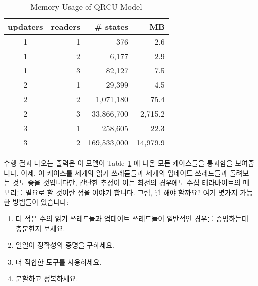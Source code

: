\begin{table}
\footnotesize
\centering
\begin{tabular}{c|r|r|r}
	updaters &
	    readers &
		   \# states & MB \\
	\hline
	1 & 1 &         376 &      2.6 \\
	\hline
	1 & 2 &       6,177 &      2.9 \\
	\hline
	1 & 3 &      82,127 &      7.5 \\
	\hline
	2 & 1 &      29,399 &      4.5 \\
	\hline
	2 & 2 &   1,071,180 &     75.4 \\
	\hline
	2 & 3 &  33,866,700 &  2,715.2 \\
	\hline
	3 & 1 &     258,605 &     22.3 \\
	\hline
	3 & 2 & 169,533,000 & 14,979.9 \\
\end{tabular}
\caption{Memory Usage of QRCU Model}
\label{tab:advsync:Memory Usage of QRCU Model}
\end{table}

수행 결과 나오는 출력은 이 모델이
Table~\ref{tab:advsync:Memory Usage of QRCU Model} 에 나온 모든 케이스들을
통과함을 보여줍니다.
이제, 이 케이스를 세개의 읽기 쓰레듣들과 세개의 업데이트 쓰레드들과 돌려보는
것도 좋을 것입니다만, 간단한 추정이 이는 최선의 경우에도 수십 테라바이트의
메모리를 필요로 할 것이란 점을 이야기 합니다.
그럼, 뭘 해야 할까요?
여기 몇가지 가능한 방법들이 있습니다:
\iffalse

The resulting output shows that this model passes all of the cases
shown in
Table~\ref{tab:advsync:Memory Usage of QRCU Model}.
Now, it would be nice to run the case with three readers and three
updaters, however, simple extrapolation indicates that this will
require on the order of a terabyte of memory best case.
So, what to do?
Here are some possible approaches:
\fi

\begin{enumerate}
\item	더 적은 수의 읽기 쓰레드들과 업데이트 쓰레드들이 일반적인 경우를
	증명하는데 충분한지 보세요.
\item	일일이 정확성의 증명을 구하세요.
\item	더 적합한 도구를 사용하세요.
\item	분할하고 정복하세요.
\iffalse

\item	See whether a smaller number of readers and updaters suffice
	to prove the general case.
\item	Manually construct a proof of correctness.
\item	Use a more capable tool.
\item	Divide and conquer.
\fi
\end{enumerate}

